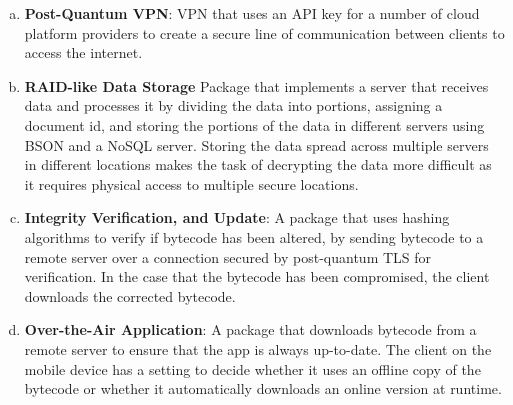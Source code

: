 \documentclass{article}
\begin{document}
\begin{enumerate}[(a)]
    \item \textbf{Post-Quantum VPN}: VPN that uses an API key for a number of cloud platform providers to create a secure line of communication between clients to access the internet.
    \item \textbf{RAID-like Data Storage} Package that implements a server that receives data and processes it by dividing the data into portions, assigning a document id, and storing the portions of the data in different servers using BSON and a NoSQL server. Storing the data spread across multiple servers in different locations makes the task of decrypting the data more difficult as it requires physical access to multiple secure locations. 
    \item \textbf{Integrity Verification, and Update}: A package that uses hashing algorithms to verify if bytecode has been altered, by sending bytecode to a remote server over a connection secured by post-quantum TLS for verification. In the case that the bytecode has been compromised, the client downloads the corrected bytecode.
    \item \textbf{Over-the-Air Application}: A package that downloads bytecode from a remote server to ensure that the app is always up-to-date. The client on the mobile device has a setting to decide whether it uses an offline copy of the bytecode or whether it automatically downloads an online version at runtime.
\end{enumerate}
\end{document}
